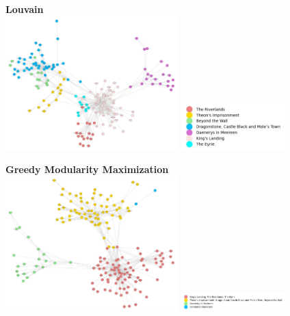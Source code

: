 \documentclass[10pt,twocolumn,letterpaper]{article}
\begin{document}
\begin{center}
    \textbf{Louvain} \\
    \includegraphics[width=0.5\textwidth]{img/s4/communities_louvain.jpg}
    \includegraphics[width=0.3\textwidth]{img/s4/louvain_legend.jpg}\\
    \caption{\small{$\#communities=7$, $modularity=0.6$}}
\end{center}



\begin{center}
    \textbf{Greedy Modularity Maximization}\\
    \includegraphics[width=0.5\textwidth]{img/s4/communities_gmm.jpg}
    \includegraphics[width=0.3\textwidth]{img/s4/gmm_legend.jpg}\\
    \caption{\small{$\#communities=4$, $modularity=0.514$}}
\end{center}
\end{document}
